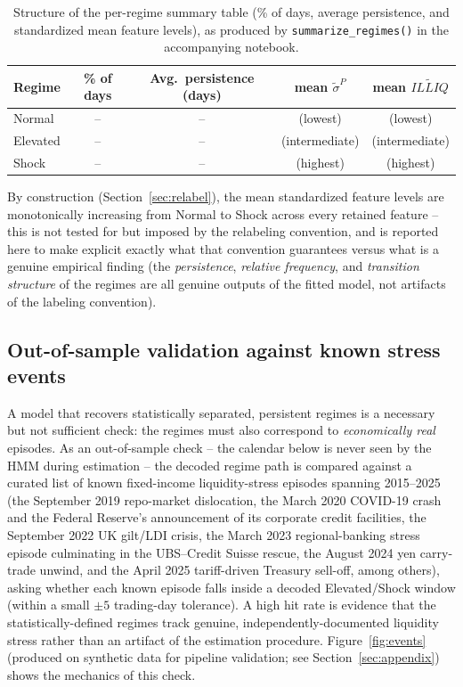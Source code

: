 \documentclass[11pt]{article}
\theoremstyle{definition}
\theoremstyle{remark}
\begin{document}
\begin{table}[H]
\centering
\caption{Structure of the per-regime summary table (\% of days, average persistence, and standardized mean feature levels), as produced by \texttt{summarize\_regimes()} in the accompanying notebook.}
\label{tab:regime-summary-template}
\begin{tabular}{lcccc}
\toprule
Regime & \% of days & Avg.\ persistence (days) & mean $\widetilde\sigma^P$ & mean $\widetilde{ILLIQ}$ \\
\midrule
Normal & -- & -- & (lowest) & (lowest) \\
Elevated & -- & -- & (intermediate) & (intermediate) \\
Shock & -- & -- & (highest) & (highest) \\
\bottomrule
\end{tabular}
\end{table}

By construction (Section~\ref{sec:relabel}), the mean standardized feature levels are monotonically increasing from Normal to Shock across every retained feature -- this is not tested for but imposed by the relabeling convention, and is reported here to make explicit exactly what that convention guarantees versus what is a genuine empirical finding (the \emph{persistence}, \emph{relative frequency}, and \emph{transition structure} of the regimes are all genuine outputs of the fitted model, not artifacts of the labeling convention).

\subsection{Out-of-sample validation against known stress events}
\label{sec:validation-events}

A model that recovers statistically separated, persistent regimes is a necessary but not sufficient check: the regimes must also correspond to \emph{economically real} episodes. As an out-of-sample check -- the calendar below is never seen by the HMM during estimation -- the decoded regime path is compared against a curated list of known fixed-income liquidity-stress episodes spanning 2015--2025 (the September 2019 repo-market dislocation, the March 2020 COVID-19 crash and the Federal Reserve's announcement of its corporate credit facilities, the September 2022 UK gilt/LDI crisis, the March 2023 regional-banking stress episode culminating in the UBS--Credit Suisse rescue, the August 2024 yen carry-trade unwind, and the April 2025 tariff-driven Treasury sell-off, among others), asking whether each known episode falls inside a decoded Elevated/Shock window (within a small $\pm5$ trading-day tolerance). A high hit rate is evidence that the statistically-defined regimes track genuine, independently-documented liquidity stress rather than an artifact of the estimation procedure. Figure~\ref{fig:events} (produced on synthetic data for pipeline validation; see Section~\ref{sec:appendix}) shows the mechanics of this check.
\end{document}
